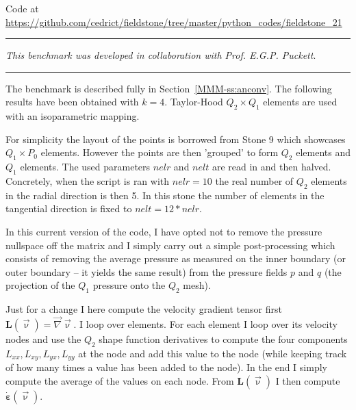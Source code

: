 

\begin{center}
Code at \url{https://github.com/cedrict/fieldstone/tree/master/python_codes/fieldstone_21}
\end{center}

\par\noindent\rule{\textwidth}{0.4pt}

{\sl This benchmark was developed in collaboration with Prof. E.G.P. Puckett}. 

\par\noindent\rule{\textwidth}{0.4pt}

The benchmark is described fully in Section~\ref{MMM-ss:anconv}. 
The following results have been obtained with $k=4$.
Taylor-Hood $Q_2\times Q_1$ elements are used with an isoparametric mapping. 

For simplicity the layout of the points is borrowed from Stone 9 which 
showcases $Q_1 \times P_0$ elements. However the points are then 'grouped' 
to form $Q_2$ elements and $Q_1$ elements. 
The used parameters $nelr$ and $nelt$ are read in and then halved. Concretely, 
when the script is ran with $nelr=10$ the real number of $Q_2$ elements 
in the radial direction is then 5. In this stone the number of elements
in the tangential direction is fixed to $nelt=12*nelr$.

In this current version of the code, I have opted not to remove the pressure nullspace
off the matrix and I simply carry out a simple post-processing which consists of 
removing the average pressure as measured on the inner boundary (or outer boundary -- it 
yields the same result) from the pressure fields $p$ and $q$ (the projection of the 
$Q_1$ pressure onto the $Q_2$ mesh). 

Just for a change I here compute the velocity gradient tensor first ${\bm L}(\vec\upnu)=\vec\nabla\vec\upnu$.
I loop over elements. For each element I loop over its velocity nodes and use the $Q_2$ 
shape function derivatives to compute the four components $L_{xx},L_{xy},L_{yx},L_{yy}$ at 
the node and add this value to the node (while keeping track of how many times a value
has been added to the node). In the end I simply compute the average of the values
on each node. From ${\bm L}(\vec\upnu)$ I then compute $\dot{\bm \varepsilon}(\vec\upnu)$. 

